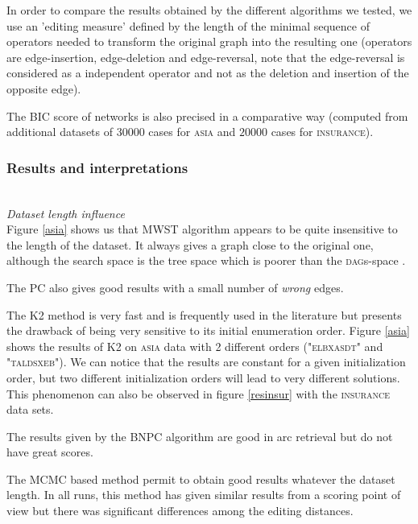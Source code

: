 
\normalsize

In order to compare the results obtained by the different algorithms we tested, we use an 'editing measure' defined by the length of the minimal sequence of operators needed to transform the original graph into the resulting one (operators are edge-insertion, edge-deletion and edge-reversal, note that the edge-reversal is considered as a independent operator and not as the deletion and insertion of the opposite edge).

The BIC score of networks is also precised in a comparative way (computed from additional datasets of $30000$ cases for \textsc{asia} and $20000$ cases for \textsc{insurance}).

\subsubsection*{Results and interpretations}
~\\\textit{Dataset length influence}~\\
Figure \ref{asia} shows us that MWST algorithm appears to be quite insensitive to the length of the dataset.
It always gives a graph close to the original one, although the search space is the tree space which is poorer than the \textsc{dag}s-space .

The PC also gives good results with a  small number of \textit{wrong} edges.

The K2 method is very fast and is frequently used in the literature but presents the drawback of being very sensitive to its initial enumeration order.
Figure \ref{asia} shows the results of K2 on \textsc{asia} data with 2 different orders ("\textsc{elbxasdt}" and "\textsc{taldsxeb}").
We can notice that the results are constant for a given initialization order, but two different initialization orders will lead to very different solutions.
This phenomenon can also be observed in figure \ref{resinsur} with the \textsc{insurance} data sets.

The results given by the BNPC algorithm are good in arc retrieval but do not have great scores.%

The MCMC based method permit to obtain good results whatever the dataset length. In all runs, this method has given similar results from a scoring point of view but there was significant differences among the editing distances.

